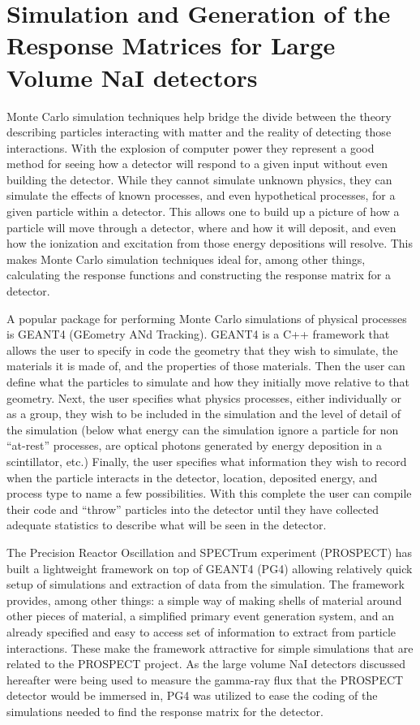 \documentclass[5p]{elsarticle}
\begin{document}
\section{Simulation and Generation of the Response Matrices for Large Volume NaI detectors}
Monte Carlo simulation techniques help bridge the divide between the theory describing particles interacting with matter and the reality of detecting those interactions. With the explosion of computer power they represent a good method for seeing how a detector will respond to a given input without even building the detector. While they cannot simulate unknown physics, they can simulate the effects of known processes, and even hypothetical processes, for a given particle within a detector. This allows one to build up a picture of how a particle will move through a detector, where and how it will deposit, and even how the ionization and excitation from those energy depositions will resolve. This makes Monte Carlo simulation techniques ideal for, among other things, calculating the response functions and constructing the response matrix for a detector.

A popular package for performing Monte Carlo simulations of physical processes is GEANT4 (GEometry ANd Tracking). GEANT4 is a C++ framework that allows the user to specify in code the geometry that they wish to simulate, the materials it is made of, and the properties of those materials. Then the user can define what the particles to simulate and how they initially move relative to that geometry. Next, the user specifies what physics processes, either individually or as a group, they wish to be included in the simulation and the level of detail of the simulation (below what energy can the simulation ignore a particle for non ``at-rest'' processes, are optical photons generated by energy deposition in a scintillator, etc.) Finally, the user specifies what information they wish to record when the particle interacts in the detector, location, deposited energy, and process type to name a few possibilities. With this complete the user can compile their code and ``throw'' particles into the detector until they have collected adequate statistics to describe what will be seen in the detector.

The Precision Reactor Oscillation and SPECTrum experiment (PROSPECT) has built a lightweight framework on top of GEANT4 (PG4) allowing relatively quick setup of simulations and extraction of data from the simulation. The framework provides, among other things: a simple way of making shells of material around other pieces of material, a simplified primary event generation system, and an already specified and easy to access set of information to extract from particle interactions. These make the framework attractive for simple simulations that are related to the PROSPECT project. As the large volume NaI detectors discussed hereafter were being used to measure the gamma-ray flux that the PROSPECT detector would be immersed in, PG4 was utilized to ease the coding of the simulations needed to find the response matrix for the detector.
\end{document}
